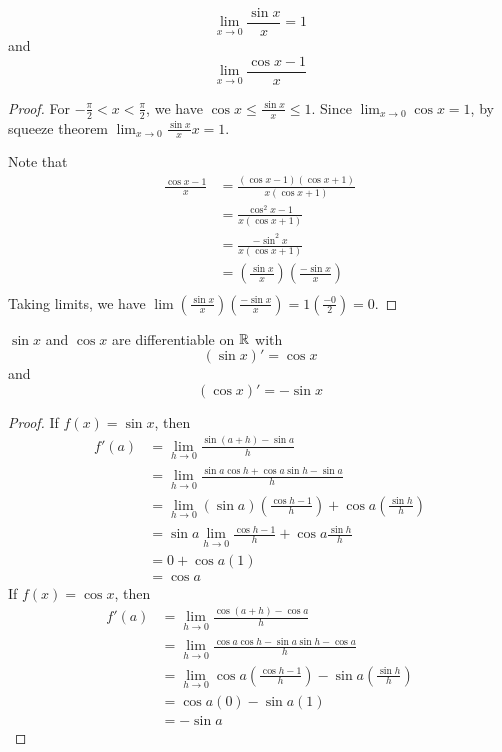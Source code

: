 \documentclass{article}
\begin{document}
\begin{theorem}
    \[\lim_{x\to 0}\frac{\sin x}{x} = 1\] and \[
    \lim_{x \to 0}\frac{\cos x - 1}{x}
    \] 
\end{theorem}
\begin{proof}
    For $-\frac{\pi}{2} < x < \frac{\pi}{2}$, we have $\cos x \leq \frac{\sin x}{x} \leq 1$. Since $\lim_{x\to 0}\cos x = 1$, by squeeze theorem $\lim_{x\to 0} \frac{\sin x}{x} x = 1$.

    Note that \begin{align*}
        \frac{\cos x - 1}{x} &= \frac{(\cos x - 1)(\cos x + 1)}{x(\cos x + 1)}\\
        &= \frac{\cos^2 x - 1}{x(\cos x + 1)}\\
        &= \frac{-\sin^2 x}{x(\cos x + 1)} \tag{Pythagorean Identity}\\
        &= \left(\frac{\sin x}{x}\right)\left(\frac{-\sin x}{x}\right)\\
    \end{align*}
    Taking limits, we have $\lim \left(\frac{\sin x}{x}\right)\left(\frac{-\sin x}{x}\right) = 1\left(\frac{-0}{2}\right) = 0$.
\end{proof}
\begin{theorem}
    $\sin x$ and $\cos x$ are differentiable on $\mathbb{R}$ with \[
        (\sin x)' = \cos x
    \] and \[
        (\cos x)' = -\sin x
    \]
\end{theorem}
\begin{proof}
    If $f(x) = \sin x$, then \begin{align*}
        f'(a) &= \lim_{h\to 0} \frac{\sin (a+h) - \sin a}{h}\\
        &= \lim_{h\to 0} \frac{\sin a\cos h +\cos a \sin h - \sin a}{h}\\
        &= \lim_{h\to 0} (\sin a)\left(\frac{\cos h - 1}{h}\right) + \cos a \left(\frac{\sin h}{h}\right)\\
        &= \sin a \lim_{h\to 0} \frac{\cos h -1}{h} + \cos a \frac{\sin h}{h}\\
        &= 0 + \cos a (1)\\
        &= \cos a
    \end{align*}
    If $f(x) = \cos x$, then \begin{align*}
        f'(a) &= \lim_{h\to 0} \frac{\cos (a+h) - \cos a}{h}\\
        &= \lim_{h\to 0} \frac{\cos a \cos h - \sin a \sin h - \cos a}{h}\\
        &= \lim_{h\to 0} \cos a \left(\frac{\cos h - 1}{h}\right) - \sin a\left( \frac{\sin h}{h}\right)\\
        &= \cos a (0) - \sin a (1)\\
        &= -\sin a
    \end{align*}
\end{proof}
\end{document}
